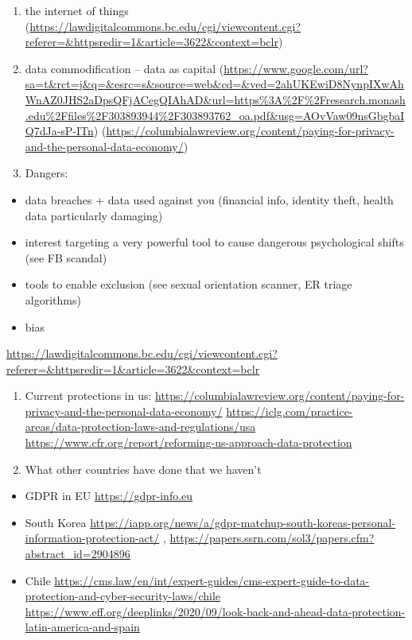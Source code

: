 \documentclass[water,article,submit,moreauthors,pdftex]{mdpi}
\providecommand{\tightlist}{%
  \setlength{\itemsep}{0pt}\setlength{\parskip}{4pt}}
\begin{document}
\begin{enumerate}
\def\labelenumi{\arabic{enumi}.}
\item
  the internet of things
  (\url{https://lawdigitalcommons.bc.edu/cgi/viewcontent.cgi?referer=\&httpsredir=1\&article=3622\&context=bclr})
\item
  data commodification -- data as capital
  (\url{https://www.google.com/url?sa=t\&rct=j\&q=\&esrc=s\&source=web\&cd=\&ved=2ahUKEwiD8NynpIXwAhWnAZ0JHS2aDpsQFjACegQIAhAD\&url=https\%3A\%2F\%2Fresearch.monash.edu\%2Ffiles\%2F303893944\%2F303893762_oa.pdf\&usg=AOvVaw09nsGbgbaIQ7dJa-sP-ITn})
  (\url{https://columbialawreview.org/content/paying-for-privacy-and-the-personal-data-economy/})
\item
  Dangers:
\end{enumerate}

\begin{itemize}
\tightlist
\item
  data breaches + data used against you (financial info, identity theft,
  health data particularly damaging)
\item
  interest targeting a very powerful tool to cause dangerous
  psychological shifts (see FB scandal)
\item
  tools to enable exclusion (see sexual orientation scanner, ER triage
  algorithms)
\item
  bias
\end{itemize}

\url{https://lawdigitalcommons.bc.edu/cgi/viewcontent.cgi?referer=\&httpsredir=1\&article=3622\&context=bclr}

\begin{enumerate}
\def\labelenumi{\arabic{enumi}.}
\setcounter{enumi}{3}
\item
  Current protections in us:
  \url{https://columbialawreview.org/content/paying-for-privacy-and-the-personal-data-economy/}
  \url{https://iclg.com/practice-areas/data-protection-laws-and-regulations/usa}
  \url{https://www.cfr.org/report/reforming-us-approach-data-protection}
\item
  What other countries have done that we haven't
\end{enumerate}

\begin{itemize}
\tightlist
\item
  GDPR in EU \url{https://gdpr-info.eu}
\item
  South Korea
  \url{https://iapp.org/news/a/gdpr-matchup-south-koreas-personal-information-protection-act/}
  , \url{https://papers.ssrn.com/sol3/papers.cfm?abstract_id=2904896}
\item
  Chile
  \url{https://cms.law/en/int/expert-guides/cms-expert-guide-to-data-protection-and-cyber-security-laws/chile}
  \url{https://www.eff.org/deeplinks/2020/09/look-back-and-ahead-data-protection-latin-america-and-spain}
\end{itemize}
\end{document}

